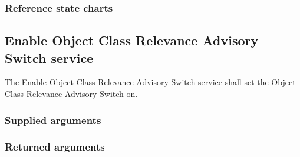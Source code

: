 \begin{compactstdpage}

    \subsubsection{Reference state charts}


    \subsection{Enable Object Class Relevance Advisory Switch service}

    The Enable Object Class Relevance Advisory Switch service shall set the Object Class Relevance Advisory Switch on.

    \subsubsection{Supplied arguments}


    \subsubsection{Returned arguments}

\end{compactstdpage}

\clearpage

